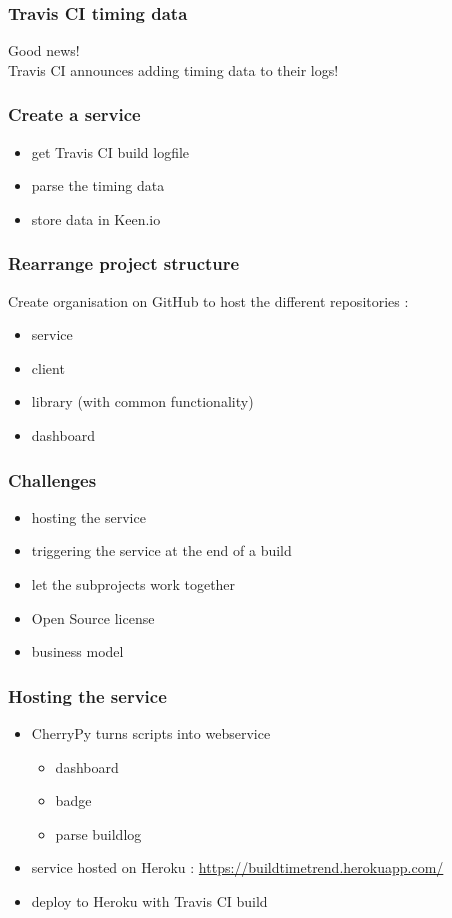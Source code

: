 \documentclass[14pt]{beamer}
\begin{document}
  \begin{frame}
    \frametitle{Travis CI timing data}
    Good news!\\
    Travis CI announces adding timing data to their logs!\\
  \end{frame}
  \begin{frame}
    \frametitle{Create a service}
    \begin{itemize}
      \item get Travis CI build logfile
      \item parse the timing data
      \item store data in Keen.io
    \end{itemize}
  \end{frame}
  \begin{frame}
    \frametitle{Rearrange project structure}
    Create organisation on GitHub to host the different repositories :
    \begin{itemize}
      \item service
      \item client
      \item library (with common functionality)
      \item dashboard
    \end{itemize}
  \end{frame}
  \begin{frame}
    \frametitle{Challenges}
    \begin{itemize}
      \item hosting the service
      \item triggering the service at the end of a build
      \item let the subprojects work together
      \item Open Source license
      \item business model
    \end{itemize}
  \end{frame}
  \begin{frame}
    \frametitle{Hosting the service}
    \begin{itemize}
      \item CherryPy turns scripts into webservice
        \begin{itemize}
          \item dashboard
          \item badge
          \item parse buildlog
        \end{itemize}
      \item service hosted on Heroku : \href{https://buildtimetrend.herokuapp.com/}{https://buildtimetrend.herokuapp.com/}
      \item deploy to Heroku with Travis CI build
    \end{itemize}
  \end{frame}
\end{document}
